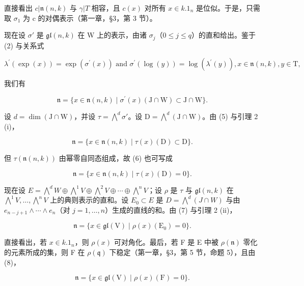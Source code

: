 直接看出 \(c|\mathfrak{n}(n,k)\) 与 \(\gamma|T\) 相容，且 \(c(x)\) 对所有 \(x \in k.1_{n}\) 是位似。于是，只需取 \(\sigma_{1}\) 为 c 的对偶表示（第一章，§3，第 3 节）。

现在设 \(\sigma'\) 是 \(\mathfrak{gl}(n,k)\) 在 W 上的表示，由诸 \(\sigma_j\)（\(0 \leq j \leq q\)）的直和给出。鉴于 (2) 与关系式

\[
\lambda^ {\prime} (\exp (x)) = \exp (\sigma^ {\prime} (x)) \text { and } \sigma^ {\prime} (\log (y)) = \log (\lambda^ {\prime} (y)), x \in \mathfrak {n} (n, k), y \in \mathrm{T},
\]

我们有

\[
\mathfrak {n} = \{x \in \mathfrak {n} (n, k) \mid \sigma^ {\prime} (x) (\mathrm{J} \cap \mathrm{W}) \subset \mathrm{J} \cap \mathrm{W} \}.\tag{5}
\]

设 \(d = \dim(\mathrm{J} \cap \mathrm{W})\)，并设 \(\tau = \bigwedge^{d} \sigma'\)。设 \(\mathrm{D} = \bigwedge^{d} (\mathrm{J} \cap \mathrm{W})\)。由 (5) 与引理 2 (i)，

\[
\mathfrak {n} = \{x \in \mathfrak {n} (n, k) \mid \tau (x) (\mathrm{D}) \subset \mathrm{D} \}.\tag{6}
\]

但 \(\tau (\mathfrak{n}(n,k))\) 由幂零自同态组成，故 (6) 也可写成

\[
\mathfrak {n} = \{x \in \mathfrak {n} (n, k) \mid \tau (x) (\mathrm{D}) = 0 \}.\tag{7}
\]

现在设 \(E = \bigwedge^{d} W \oplus \bigwedge^{1} V \oplus \bigwedge^{2} V \oplus \cdots \oplus \bigwedge^{n} V\)；设 \(\rho\) 是 \(\tau\) 与 \(\mathfrak{gl}(n, k)\) 在 \(\bigwedge^{1} V, \ldots, \bigwedge^{n} V\) 上的典则表示的直和。设 \(E_{0} \subset E\) 是 \(D = \bigwedge^{d} (J \cap W)\) 与由 \(e_{n-j+1} \wedge \cdots \wedge e_{n}\)（对 \(j = 1, \ldots, n\)）生成的直线的和。由 (7) 与引理 2 (ii)，

\[
\mathfrak {n} = \{x \in \mathfrak {g l} (\mathrm{V}) \mid \rho (x) (\mathrm{E} _ {0}) = 0 \}.\tag{8}
\]

直接看出，若 \(x \in k.1_{n}\)，则 \(\rho(x)\) 可对角化。最后，若 F 是 E 中被 \(\rho(\mathfrak{n})\) 零化的元素所成的集，则 F 在 \(\rho(\mathfrak{q})\) 下稳定（第一章，§3，第 5 节，命题 5），且由 (8)，

\[
\mathfrak {n} = \{x \in \mathfrak {g l} (\mathrm{V}) \mid \rho (x) (\mathrm{F}) = 0 \}.\tag{9}
\]

